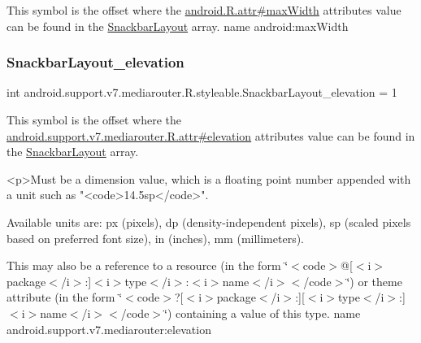 This symbol is the offset where the \hyperlink{}{android.\+R.\+attr\#max\+Width} attribute\textquotesingle{}s value can be found in the \hyperlink{classandroid_1_1support_1_1v7_1_1mediarouter_1_1R_1_1styleable_a1653efd198ae58b5c9d976b12d23f9a7}{Snackbar\+Layout} array.  name android\+:max\+Width \mbox{\label{classandroid_1_1support_1_1v7_1_1mediarouter_1_1R_1_1styleable_a1367ffb5eb169f89174a1b2c0d5c78f8}} 
\subsubsection{\texorpdfstring{Snackbar\+Layout\+\_\+elevation}{SnackbarLayout\_elevation}}
{\footnotesize\ttfamily int android.\+support.\+v7.\+mediarouter.\+R.\+styleable.\+Snackbar\+Layout\+\_\+elevation = 1\hspace{0.3cm}{\ttfamily [static]}}

This symbol is the offset where the \hyperlink{classandroid_1_1support_1_1v7_1_1mediarouter_1_1R_1_1attr_ab1ec64066729d67ab6ae697dc2178d06}{android.\+support.\+v7.\+mediarouter.\+R.\+attr\#elevation} attribute\textquotesingle{}s value can be found in the \hyperlink{classandroid_1_1support_1_1v7_1_1mediarouter_1_1R_1_1styleable_a1653efd198ae58b5c9d976b12d23f9a7}{Snackbar\+Layout} array.

\begin{DoxyVerb}      <p>Must be a dimension value, which is a floating point number appended with a unit such as "<code>14.5sp</code>".
\end{DoxyVerb}
 Available units are\+: px (pixels), dp (density-\/independent pixels), sp (scaled pixels based on preferred font size), in (inches), mm (millimeters). 

This may also be a reference to a resource (in the form \char`\"{}$<$code$>$@\mbox{[}$<$i$>$package$<$/i$>$\+:\mbox{]}$<$i$>$type$<$/i$>$\+:$<$i$>$name$<$/i$>$$<$/code$>$\char`\"{}) or theme attribute (in the form \char`\"{}$<$code$>$?\mbox{[}$<$i$>$package$<$/i$>$\+:\mbox{]}\mbox{[}$<$i$>$type$<$/i$>$\+:\mbox{]}$<$i$>$name$<$/i$>$$<$/code$>$\char`\"{}) containing a value of this type.  name android.\+support.\+v7.\+mediarouter\+:elevation \mbox{\label{classandroid_1_1support_1_1v7_1_1mediarouter_1_1R_1_1styleable_a5dd123494310cce9535c4fb463205145}} 
